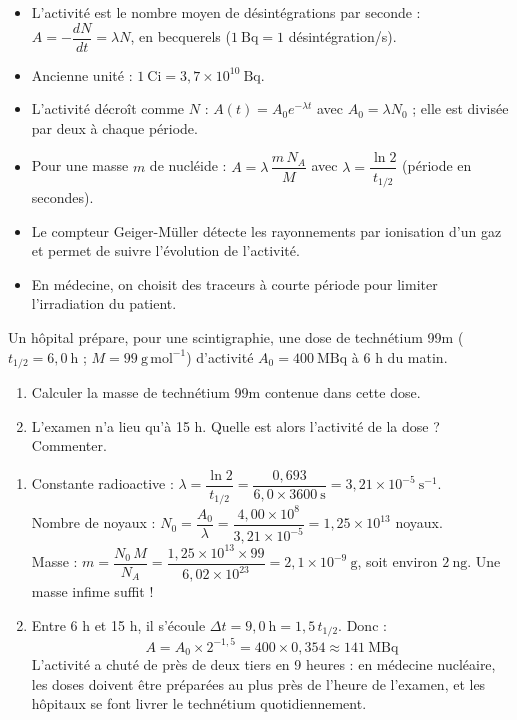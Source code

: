 \documentclass[11pt]{article}
\begin{document}
\begin{aretenir}
\begin{itemize}
\item L'activité est le nombre moyen de désintégrations par seconde : $A = -\dfrac{dN}{dt} = \lambda N$, en becquerels ($1~\mathrm{Bq} = 1$ désintégration/s).
\item Ancienne unité : $1~\mathrm{Ci} = 3{,}7 \times 10^{10}~\mathrm{Bq}$.
\item L'activité décroît comme $N$ : $A(t) = A_0 e^{-\lambda t}$ avec $A_0 = \lambda N_0$ ; elle est divisée par deux à chaque période.
\item Pour une masse $m$ de nucléide : $A = \lambda\,\dfrac{m\,N_A}{M}$ avec $\lambda = \dfrac{\ln 2}{t_{1/2}}$ (période en secondes).
\item Le compteur Geiger-Müller détecte les rayonnements par ionisation d'un gaz et permet de suivre l'évolution de l'activité.
\item En médecine, on choisit des traceurs à courte période pour limiter l'irradiation du patient.
\end{itemize}
\end{aretenir}

\begin{exercice}
Un hôpital prépare, pour une scintigraphie, une dose de technétium 99m ($t_{1/2} = 6{,}0~\mathrm{h}$ ; $M = 99~\mathrm{g\,mol^{-1}}$) d'activité $A_0 = 400~\mathrm{MBq}$ à 6 h du matin.
\begin{enumerate}
\item Calculer la masse de technétium 99m contenue dans cette dose.
\item L'examen n'a lieu qu'à 15 h. Quelle est alors l'activité de la dose ? Commenter.
\end{enumerate}
\end{exercice}

\begin{corrige}
\begin{enumerate}
\item Constante radioactive : $\lambda = \dfrac{\ln 2}{t_{1/2}} = \dfrac{0{,}693}{6{,}0 \times 3600~\mathrm{s}} = 3{,}21 \times 10^{-5}~\mathrm{s^{-1}}$.\\
Nombre de noyaux : $N_0 = \dfrac{A_0}{\lambda} = \dfrac{4{,}00 \times 10^{8}}{3{,}21 \times 10^{-5}} = 1{,}25 \times 10^{13}$ noyaux.\\
Masse : $m = \dfrac{N_0\,M}{N_A} = \dfrac{1{,}25 \times 10^{13} \times 99}{6{,}02 \times 10^{23}} = 2{,}1 \times 10^{-9}~\mathrm{g}$, soit environ $2~\mathrm{ng}$. Une masse infime suffit !
\item Entre 6 h et 15 h, il s'écoule $\Delta t = 9{,}0~\mathrm{h} = 1{,}5\,t_{1/2}$. Donc :
\[ A = A_0 \times 2^{-1{,}5} = 400 \times 0{,}354 \approx 141~\mathrm{MBq} \]
L'activité a chuté de près de deux tiers en 9 heures : en médecine nucléaire, les doses doivent être préparées au plus près de l'heure de l'examen, et les hôpitaux se font livrer le technétium quotidiennement.
\end{enumerate}
\end{corrige}
\end{document}
